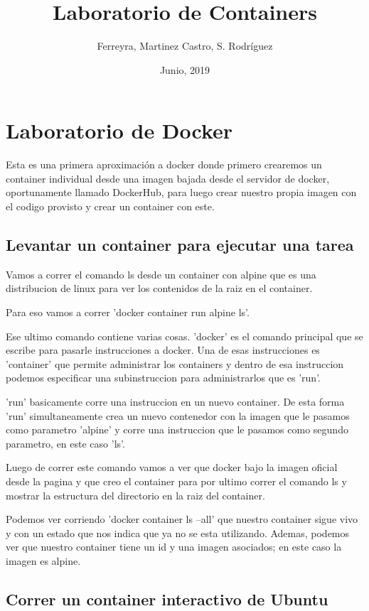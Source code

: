 \documentclass[11pt]{article} %
\title{Laboratorio de Containers}
\author{Ferreyra, Martinez Castro, S. Rodríguez}
\date{Junio, 2019} %
\begin{document}
\maketitle

\section{Laboratorio de Docker}

Esta es una primera aproximación a docker donde primero crearemos un container individual desde una imagen bajada desde el servidor de docker, oportunamente llamado DockerHub, para luego crear nuestro propia imagen con el codigo provisto y crear un container con este.

\subsection{Levantar un container para ejecutar una tarea}

Vamos a correr el comando ls desde un container con alpine que es una distribucion de linux para ver los contenidos de la raiz en el container.

Para eso vamos a correr 'docker container run alpine ls'.

Ese ultimo comando contiene varias cosas. 'docker' es el comando principal que se escribe para pasarle instrucciones a docker. Una de esas instrucciones es 'container' que permite administrar los containers y dentro de esa instruccion podemos especificar una subinstruccion para administrarlos que es 'run'.

'run' basicamente corre una instruccion en un nuevo container. De esta forma 'run' simultaneamente crea un nuevo contenedor con la imagen que le pasamos como parametro 'alpine' y corre una instruccion que le pasamos como segundo parametro, en este caso 'ls'.


Luego de correr este comando vamos a ver que docker bajo la imagen oficial desde la pagina y que creo el container para por ultimo correr el comando ls y mostrar la estructura del directorio en la raiz del container.

Podemos ver corriendo 'docker container ls --all' que nuestro container sigue vivo y con un estado que nos indica que ya no se esta utilizando. Ademas, podemos ver que nuestro  container tiene un id y una imagen asociados; en este caso la imagen es alpine.

\subsection{Correr un container interactivo de Ubuntu}
\end{document}

